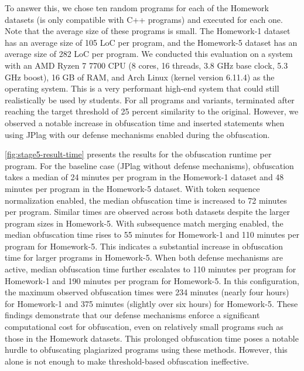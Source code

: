 To answer this, we chose ten random programs for each of the Homework datasets (\mossad is only compatible with C++ programs) and executed \mossad for each one.
Note that the average size of these programs is small. The Homework-1 dataset has an average size of 105 LoC per program, and the Homework-5 dataset has an average size of 282 LoC per program.
We conducted this evaluation on a system with an AMD Ryzen 7 7700 CPU (8 cores, 16 threads, 3.8 GHz base clock, 5.3 GHz boost), 16 GB of RAM, and Arch Linux (kernel version 6.11.4) as the operating system.
This is a very performant high-end system that could still realistically be used by students.
%
For all programs and variants, \mossad terminated after reaching the target threshold of 25 percent similarity to the original.
However, we observed a notable increase in obfuscation time and inserted statements when using JPlag with our defense mechanisms enabled during the obfuscation.

\autoref{fig:stage5-result-time} presents the results for the obfuscation runtime per program. For the baseline case (JPlag without defense mechanisms), obfuscation takes a median of 24 minutes per program in the Homework-1 dataset and 48 minutes per program in the Homework-5 dataset.
%
With token sequence normalization enabled, the median obfuscation time is increased to 72 minutes per program. Similar times are observed across both datasets despite the larger program sizes in Homework-5.
%
With subsequence match merging enabled, the median obfuscation time rises to 55 minutes for Homework-1 and 110 minutes per program for Homework-5. This indicates a substantial increase in obfuscation time for larger programs in Homework-5. 
When both defense mechanisms are active, median obfuscation time further escalates to 110 minutes per program for Homework-1 and 190 minutes per program for Homework-5. In this configuration, the maximum observed obfuscation times were 234 minutes (nearly four hours) for Homework-1 and 375 minutes (slightly over six hours) for Homework-5.
%
These findings demonstrate that our defense mechanisms enforce a significant computational cost for obfuscation, even on relatively small programs such as those in the Homework datasets. This prolonged obfuscation time poses a notable hurdle to obfuscating plagiarized programs using these methods. However, this alone is not enough to make threshold-based obfuscation ineffective.


